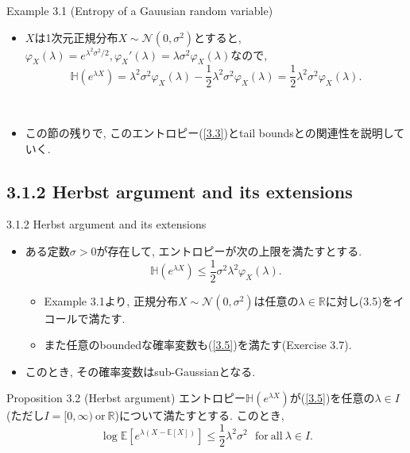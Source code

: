\documentclass[aspectratio=169, dvipdfmx]{beamer}
\newcommand{\ex}{\mathbb{E}}
\begin{document}
\begin{frame}
\begin{exampleblock}{Example 3.1 (Entropy of a Gauusian random variable)}
    \begin{itemize}
        \item $X$は1次元正規分布$X\sim \mathcal{N}(0, \sigma^2)$とすると, $\varphi_X(\lambda) = e^{\lambda^2\sigma^2/2}, \varphi_X'(\lambda) = \lambda \sigma^2\varphi_X(\lambda)$なので,
        \[ \mathbb{H}(e^{\lambda X}) = \lambda^2\sigma^2\varphi_X(\lambda) - \frac{1}{2}\lambda^2\sigma^2\varphi_X(\lambda) = \frac{1}{2}\lambda^2\sigma^2\varphi_X(\lambda). \tag{3.4}\label{3.4}\]
    \end{itemize}
\end{exampleblock}
　\\
\begin{itemize}
    \item この節の残りで, このエントロピー(\ref{3.3})とtail boundsとの関連性を説明していく.
\end{itemize}
\end{frame}

\subsection{3.1.2 Herbst argument and its extensions}
\begin{frame}{3.1.2 Herbst argument and its extensions}
\begin{itemize}
    \item ある定数$\sigma > 0$が存在して, エントロピーが次の上限を満たすとする.
    \[ \mathbb{H}(e^{\lambda X}) \le \frac{1}{2}\sigma^2 \lambda^2\varphi_X(\lambda).\tag{3.5}\label{3.5} \]
    \begin{itemize}
        \item Example 3.1より, 正規分布$X\sim \mathcal{N}(0,\sigma^2)$は任意の$\lambda \in \mathbb{R}$に対し(3.5)をイコールで満たす.
        \item また任意のboundedな確率変数も(\ref{3.5})を満たす(Exercise 3.7).
    \end{itemize}
    \item このとき, その確率変数はsub-Gaussianとなる.
\end{itemize}
\begin{block}{Proposition 3.2 (Herbst argument)}
    エントロピー$\mathbb{H}(e^{\lambda X})$が(\ref{3.5})を任意の$\lambda \in I$ (ただし$I=[0, \infty)\ \mathrm{or}\ \mathbb{R}$)について満たすとする.
    このとき,
    \[ \log \ex[e^{\lambda(X-\ex[X])}] \le \frac{1}{2}\lambda^2\sigma^2 \ \ \ \mathrm{for\ all}\ \lambda\in I. \tag{3.6}\label{3.6} \]
\end{block}
\end{frame}
\end{document}
